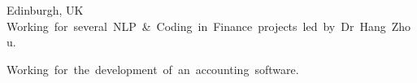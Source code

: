 \documentclass[%
               doublesided,
               paper=a4,
               fontsize=11pt
              ]{my-resume}
\begin{document}
{         {Edinburgh, UK}
    \hbox{\small Working for several NLP \& Coding in Finance projects led by Dr Hang Zhou.}
    \divider
    
    \hbox{\small Working for the development of an accounting software.}
    \divider
    
    


    
    
}
\makebody
\clearpage
\end{document}
